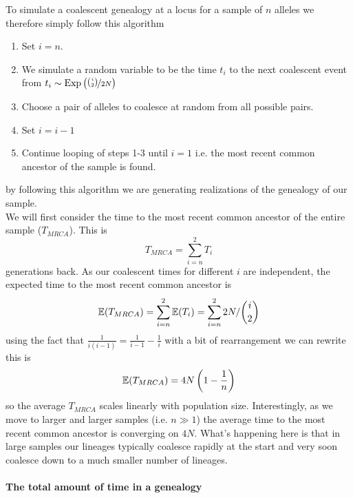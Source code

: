 To simulate a coalescent genealogy at a locus for a sample of $n$ alleles we therefore simply follow this
algorithm
\begin{enumerate}
\item Set $i=n$.
\item We simulate a random variable to be the time $t_i$ to the next coalescent event from $t_i \sim
  \text{Exp}\left(\nicefrac{{i \choose
 2}}{2N} \right)$
\item Choose a pair of alleles to coalesce at random from all possible
 pairs.
\item Set $i=i-1$
\item Continue looping of steps 1-3 until $i=1$ i.e. the most recent
 common ancestor of the sample is found.
\end{enumerate}
by following this algorithm we are generating realizations of the
genealogy of our sample. \\

We will first consider the time to the most recent common ancestor of
the entire sample ($T_{MRCA}$). This is
\begin{equation}
T_{MRCA} = \sum_{i=n}^2 T_i
\end{equation}
generations back. As our coalescent times for different $i$ are independent, the expected time to the most recent common ancestor
is
\begin{equation}
\mathbb{E}(T_{MRCA}) = \sum_{i=n}^2 \mathbb{E}(T_i) = \sum_{i=n}^2  2N/{i \choose
 2}
\end{equation}
using the fact that $\frac{1}{i(i-1)}=\frac{1}{i-1} - \frac{1}{i}$ with a bit of
rearrangement we can rewrite this is
\begin{equation} 
\mathbb{E}(T_{MRCA}) = 4N\left(1- \frac{1}{n} \right) \label{TMRCA_neutral}
\end{equation}
so the average $T_{MRCA}$ scales linearly with population
size. Interestingly, as we move to larger and larger samples (i.e. $n \gg 1$) the average
time to the most recent common ancestor is converging on $4N$. What's
happening here is that in large samples our lineages typically coalesce rapidly
at the start and very soon coalesce down to a much smaller number of
lineages.   \\



\paragraph{The total amount of time in a genealogy}

